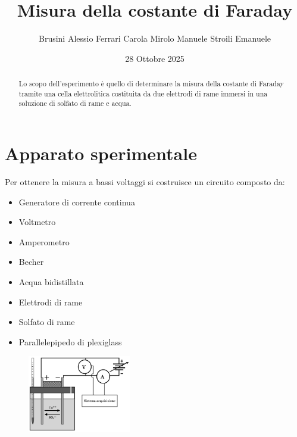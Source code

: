 \documentclass[10pt,twocolumn]{article}
\begin{document}
\justifying
	\title{\textbf{Misura della costante di Faraday}}
	\author{Brusini Alessio \hspace{0.7cm} Ferrari Carola \hspace{0.7cm} Mirolo Manuele \hspace{0.7cm} Stroili Emanuele}
	\date{28 Ottobre 2025}
	\maketitle
	\onecolumn
	\tableofcontents
\vspace{3cm}
	\begin{abstract}
		\centering
		\large
    Lo scopo dell'esperimento è quello di determinare la misura della costante di Faraday tramite una cella elettrolitica costituita da due elettrodi di rame immersi in una soluzione di solfato di rame e acqua.
       
	\end{abstract}

	\newpage
\restoregeometry
\twocolumn

\section{Apparato sperimentale}
Per ottenere la misura a bassi voltaggi si costruisce un circuito composto da:
\begin{itemize}
    \item Generatore di corrente continua
    \item Voltmetro
    \item Amperometro
    \item Becher
    \item Acqua bidistillata
    \item Elettrodi di rame
    \item Solfato di rame
    \item Parallelepipedo di plexiglass
\end{itemize}
\begin{figure}[H]
    \centering
    \includegraphics[width=0.4\textwidth]{Apparato_sperimentale.jpeg} %
    \label{fig:I/V_fotodiodo}
\end{figure}
\end{document}

